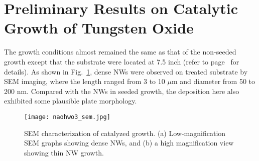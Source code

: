 \section{Preliminary Results on Catalytic Growth of Tungsten Oxide}\label{sec:nawo}
The growth conditions almost remained the same as that of the non-seeded  growth except that the substrate were located at 7.5 inch (refer to page~\pageref{sec:woxnonseed} for details). As shown in Fig.~\ref{fig:naohwsem}, dense NWs were observed on  treated substrate by SEM imaging, where the length ranged from 3 to 10 $\mu$m and diameter from 50 to 200 nm. Compared with the  NWs in seeded growth, the deposition here also exhibited some plausible plate morphology.
\begin{figure}[htb]
\centering
\texttt{[image: naohwo3\_sem.jpg]}
\caption[SEM characterization of  catalyzed  growth]{SEM characterization of  catalyzed  growth. (a) Low-magnification SEM graphs showing dense  NWs, and (b) a high magnification view showing thin NW growth.}
\label{fig:naohwsem}
\end{figure}


